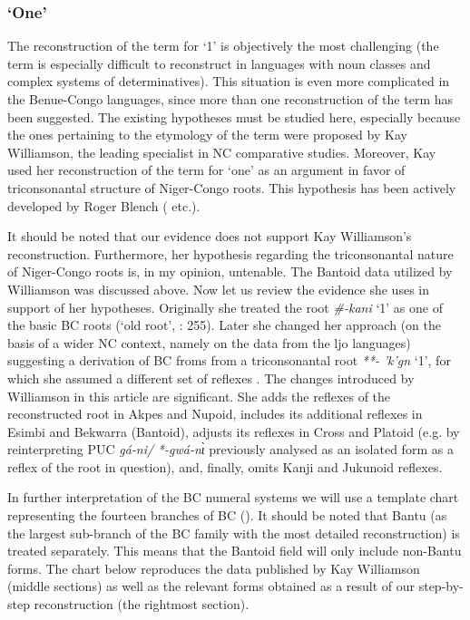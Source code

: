 \subsubsection{‘One’}\label{sec:3.1.4.1}
The reconstruction of the term for ‘1’ is objectively the most challenging (the term is especially difficult to reconstruct in languages with noun classes and complex systems of determinatives). This situation is even more complicated in the Benue-Congo languages, since more than one reconstruction of the term has been suggested. The existing hypotheses must be studied here, especially because the ones pertaining to the etymology of the term were proposed by Kay Williamson, the leading specialist in NC comparative studies. Moreover, Kay \citet{Williamson1989b} used her reconstruction of the term for ‘one’ as an argument in favor of triconsonantal structure of Niger-Congo roots. This hypothesis has been actively developed by Roger Blench (\citeyear*{Blench2012a} etc.). 

It should be noted that our evidence does not support Kay Williamson’s reconstruction. Furthermore, her hypothesis regarding the triconsonantal nature of Niger-Congo roots is, in my opinion, untenable. The Bantoid data utilized by Williamson was discussed above. Now let us review the evidence she uses in support of her hypotheses. Originally she treated the root \textit{\#-kani} ‘1’ as one of the basic BC roots (‘old root’, \citealt{Williamson1989b}: 255). Later she changed her approach (on the basis of a wider NC context, namely on the data from the ljo languages) suggesting a derivation of BC froms from a triconsonantal root \textit{**-} \textit{'k{}'g{}n{}} ‘1’, for which she assumed a different set of reflexes \citep[396]{Williamson1992}. The changes introduced by Williamson in this article are significant. She adds the reflexes of the reconstructed root in Akpes and Nupoid, includes its additional reflexes in Esimbi and Bekwarra (Bantoid), adjusts its reflexes in Cross and Platoid (e.g. by reinterpreting PUC \textit{gá-ni/} \textit{*-gwá-n{\`{ɩ}}} previously analysed as an isolated form as a reflex of the root in question), and, finally, omits Kanji and Jukunoid reflexes.

In further interpretation of the BC numeral systems we will use a template chart representing the fourteen branches of BC (). It should be noted that Bantu (as the largest sub-branch of the BC family with the most detailed reconstruction) is treated separately. This means that the Bantoid field will only include non-Bantu forms. The chart below reproduces the data published by Kay Williamson (middle sections) as well as the relevant forms obtained as a result of our step-by-step reconstruction (the rightmost section).

